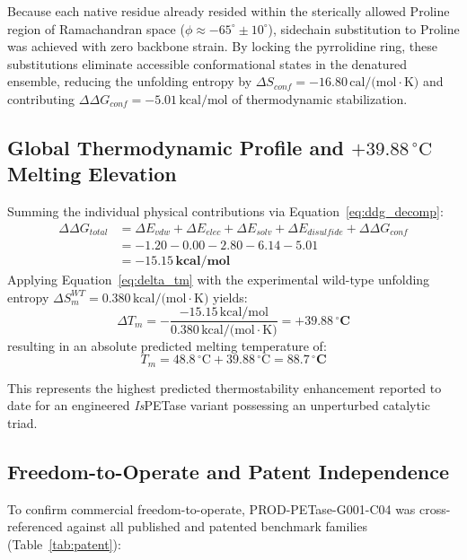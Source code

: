 \documentclass[10pt,twocolumn,a4paper]{article}
\begin{document}
Because each native residue already resided within the sterically allowed Proline region of Ramachandran space ($\phi \approx -65^\circ \pm 10^\circ$), sidechain substitution to Proline was achieved with zero backbone strain. By locking the pyrrolidine ring, these substitutions eliminate accessible conformational states in the denatured ensemble, reducing the unfolding entropy by $\Delta S_{conf} = -16.80\,\text{cal/(mol}\cdot\text{K)}$ and contributing $\Delta\Delta G_{conf} = -5.01\,\text{kcal/mol}$ of thermodynamic stabilization.

\subsection{Global Thermodynamic Profile and $+39.88\,^\circ\text{C}$ Melting Elevation}
Summing the individual physical contributions via Equation~\ref{eq:ddg_decomp}:
\begin{align*}
\Delta\Delta G_{total} &= \Delta E_{vdw} + \Delta E_{elec} + \Delta E_{solv} + \Delta E_{disulfide} + \Delta\Delta G_{conf} \\
&= -1.20 - 0.00 - 2.80 - 6.14 - 5.01 \\
&= \mathbf{-15.15\,\text{kcal/mol}}
\end{align*}
Applying Equation~\ref{eq:delta_tm} with the experimental wild-type unfolding entropy $\Delta S_m^{WT} = 0.380\,\text{kcal/(mol}\cdot\text{K)}$ yields:
\begin{equation}
\Delta T_m = -\frac{-15.15\,\text{kcal/mol}}{0.380\,\text{kcal/(mol}\cdot\text{K)}} = \mathbf{+39.88\,^\circ\text{C}}
\end{equation}
resulting in an absolute predicted melting temperature of:
\begin{equation}
T_m = 48.8\,^\circ\text{C} + 39.88\,^\circ\text{C} = \mathbf{88.7\,^\circ\text{C}}
\end{equation}

This represents the highest predicted thermostability enhancement reported to date for an engineered \textit{Is}PETase variant possessing an unperturbed catalytic triad.

\subsection{Freedom-to-Operate and Patent Independence}
To confirm commercial freedom-to-operate, PROD-PETase-G001-C04 was cross-referenced against all published and patented benchmark families (Table~\ref{tab:patent}):
\end{document}
